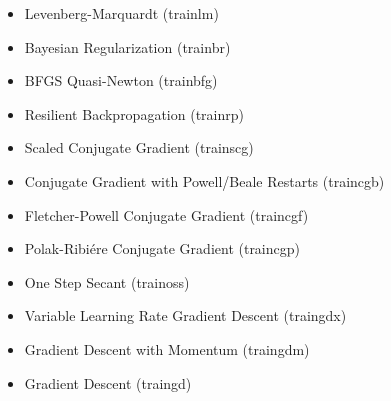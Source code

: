 \begin{itemize}
	\item Levenberg-Marquardt (trainlm)
	\item Bayesian Regularization  (trainbr) 
	\item BFGS Quasi-Newton (trainbfg)
	\item Resilient Backpropagation (trainrp)
	\item Scaled Conjugate Gradient (trainscg)
	\item Conjugate Gradient with Powell/Beale Restarts (traincgb)
	\item Fletcher-Powell Conjugate Gradient (traincgf)
	\item Polak-Ribiére Conjugate Gradient (traincgp)
	\item One Step Secant (trainoss)
	\item Variable Learning Rate Gradient Descent (traingdx)
	\item Gradient Descent with Momentum (traingdm)
	\item Gradient Descent (traingd)
\end{itemize} 









  
  
  
  
  
 
